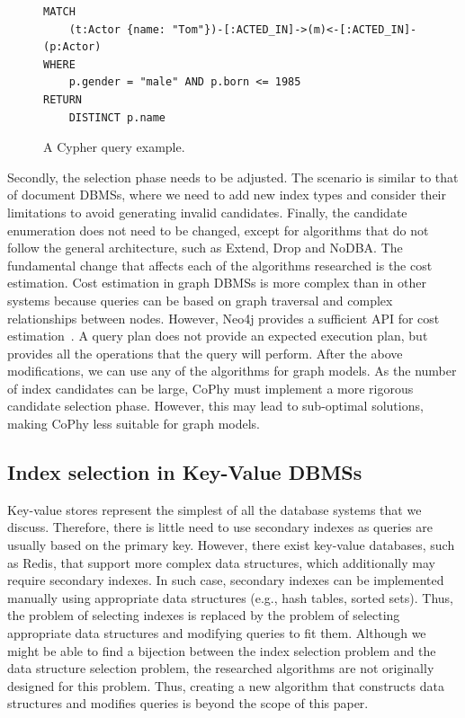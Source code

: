 \begin{figure}[ht!]
\begin{Verbatim}[frame=single,fontsize=\small]
MATCH
    (t:Actor {name: "Tom"})-[:ACTED_IN]->(m)<-[:ACTED_IN]-(p:Actor) 
WHERE 
    p.gender = "male" AND p.born <= 1985
RETURN 
    DISTINCT p.name
\end{Verbatim}
\caption{A Cypher query example.}
\end{figure}

Secondly, the selection phase needs to be adjusted. The scenario is similar to that of document DBMSs, where we need to add new index types and consider their limitations to avoid generating invalid candidates. Finally, the candidate enumeration does not need to be changed, except for algorithms that do not follow the general architecture, such as Extend, Drop and NoDBA. The fundamental change that affects each of the algorithms researched is the cost estimation. Cost estimation in graph DBMSs is more complex than in other systems because queries can be based on graph traversal and complex relationships between nodes. However, Neo4j provides a sufficient API for cost estimation~\citep{neo4jExecutionPlans}. A query plan does not provide an expected execution plan, but provides all the operations that the query will perform. After the above modifications, we can use any of the algorithms for graph models. As the number of index candidates can be large, CoPhy must implement a more rigorous candidate selection phase. However, this may lead to sub-optimal solutions, making CoPhy less suitable for graph models.

\subsection{Index selection in Key-Value DBMSs}
Key-value stores represent the simplest of all the database systems that we discuss. Therefore, there is little need to use secondary indexes as queries are usually based on the primary key. However, there exist key-value databases, such as Redis, that support more complex data structures, which additionally may require secondary indexes. In such case, secondary indexes can be implemented manually using appropriate data structures (e.g., hash tables, sorted sets). Thus, the problem of selecting indexes is replaced by the problem of selecting appropriate data structures and modifying queries to fit them. Although we might be able to find a bijection between the index selection problem and the data structure selection problem, the researched algorithms are not originally designed for this problem. Thus, creating a new algorithm that constructs data structures and modifies queries is beyond the scope of this paper.

